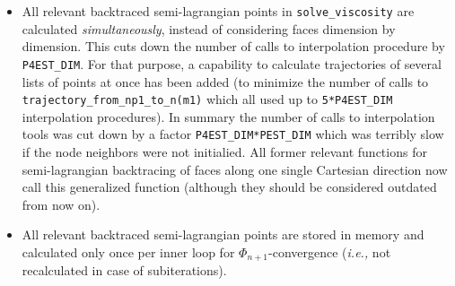\documentclass[11pt, a4paper]{article}
\theoremstyle{remark}
\begin{document}
\begin{itemize}
 \item All relevant backtraced semi-lagrangian points in \verb|solve_viscosity| are calculated \emph{simultaneously}, instead of considering faces dimension by dimension. This cuts down the number of calls to interpolation procedure by \verb|P4EST_DIM|. For that purpose, a capability to calculate trajectories of several lists of points at once has been added (to minimize the number of calls to \verb|trajectory_from_np1_to_n(m1)| which all used up to \verb|5*P4EST_DIM| interpolation procedures). In summary the number of calls to interpolation tools was cut down by a factor \verb|P4EST_DIM*PEST_DIM| which was terribly slow if the node neighbors were not initialied. All former relevant functions for semi-lagrangian backtracing of faces along one single Cartesian direction now call this generalized function (although they should be considered outdated from now on).
 \item All relevant backtraced semi-lagrangian points are stored in memory and calculated only once per inner loop for $\Phi_{n+1}$-convergence (\textit{i.e.,} not recalculated in case of subiterations).
\end{itemize}
\end{document}
